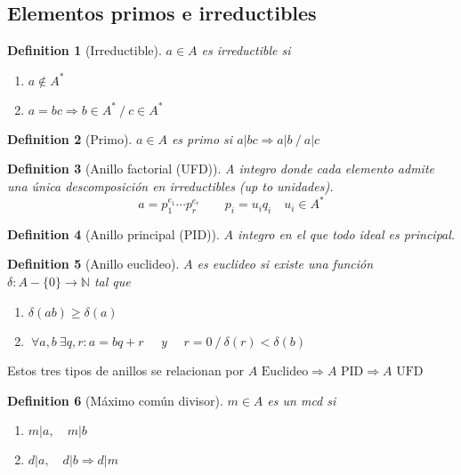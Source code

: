 \documentclass[leqno]{article}
\newtheorem*{definition}{Definition}
\begin{document}
\subsection{Elementos primos e irreductibles}
\begin{definition}[Irreductible] $a\in A$ es irreductible si
  \begin{enumerate}[topsep=-6pt, itemsep=0pt]
    \item $a\not\in A^*$
	\item $a=bc \Rightarrow  b\in A^* \ /\  c \in A^*$
  \end{enumerate}
\end{definition}

\begin{definition}[Primo] $a\in A$ es primo si $a|bc \Rightarrow a|b \ /\  a|c$

\end{definition}

\begin{definition}[Anillo factorial (UFD)] A integro donde cada elemento admite una única descomposición en irreductibles (up to unidades).
  \[
  a = p_1^{e_{1}}\cdots p_r^{e_r} \qquad p_i = u_iq_i \quad u_i\in A^*
  \] 
\end{definition}

\begin{definition}[Anillo principal (PID)] $A$ integro en el que todo ideal es principal. 

\end{definition}

\begin{definition}[Anillo euclideo] $A$ es euclideo si existe una función $\delta : A-\{0\} \to \mathbb{N} $ tal que
  \begin{enumerate}[topsep=-6pt, itemsep=0pt]
    \item $\delta(ab)\ge \delta(a)$
	\item $\ \forall a, b \ \exists q, r : a=bq+r \quad$   y   $\quad r=0 \ /\ \delta(r)<\delta(b)$
  \end{enumerate}
\end{definition}

Estos tres tipos de anillos se relacionan por $\boxed{A \text{ Euclideo} \Rightarrow A \text{ PID}\Rightarrow A \text{ UFD}}$

\begin{definition}[Máximo común divisor] $m\in A$ es un mcd si
  \begin{enumerate}[topsep=-6pt, itemsep=0pt]
    \item $m| a, \quad m|b$
	\item $d|a, \quad d|b \Rightarrow d|m$
  \end{enumerate}
\end{definition}
\end{document}
